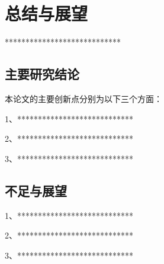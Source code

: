 \chapter{总结与展望}

****************************


\section{主要研究结论}


本论文的主要创新点分别为以下三个方面：

1、****************************

2、****************************

3、****************************



\section{不足与展望}
1、****************************

2、****************************

3、****************************
